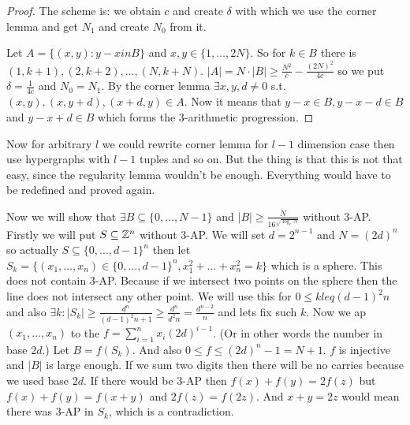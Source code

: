 \begin{proof}
	The scheme is: we obtain $c$ and create $\delta$ with which we use the corner lemma and get $N_1$ and create $N_0$ from it.
	
	Let $A = \{(x,y) : y-x in B\}$ and $x,y \in \{1, \dots, 2N\}$. So for $k \in B$ there is $(1,k+1), (2,k+2), \dots, (N, k+N)$. $|A| = N \cdot |B| \geq \frac{N^2}{c} - \frac{(2N)^2}{4c}$ so we put $\delta = \frac{1}{4c}$ and $N_0 = N_1$. By the corner lemma $\exists x,y,d \neq 0$ s.t. $(x,y), (x,y+d), (x+d,y) \in A$. Now it means that $y-x \in B, y-x -d \in B$ and $y-x+d \in B$ which forms the 3-arithmetic progression.
\end{proof}

Now for arbitrary $l$ we could rewrite corner lemma for $l-1$ dimension case then use hypergraphs with $l-1$ tuples and so on. But the thing is that this is not that easy, since the regularity lemma wouldn't be enough. Everything would have to be redefined and proved again. %

Now we will show that $\exists B \subseteq \{0, \dots, N-1\}$ and $|B| \geq \frac{N}{16^{\sqrt{\log_e N}}}$ without 3-AP. Firstly we will put $S \subseteq \mathbb{Z}^n$ without 3-AP. We will set $d = 2^{n-1}$ and $N = (2d)^n$ so actually $S \subseteq \{0, \dots, d-1\}^n$ then let $S_k = \{(x_1, \dots, x_n) \in \{0, \dots, d-1\}^n, x_1^2 + \dots + x_n^2 = k\}$ which is a sphere. This does not contain 3-AP. Because if we intersect two points on the sphere then the line does not intersect any other point. We will use this for $0 \leq k leq (d-1)^2n$ and also $\exists k: |S_k| \geq \frac{d^n}{(d-1)^2n+1} \geq \frac{d^n}{d^2n} = \frac{d^{n-2}}{n}$ and lets fix such $k$. Now we ap $(x_1, \dots, x_n)$ to the $f = \sum_{i = 1}^n x_i (2d)^{i-1}$. (Or in other words the number in base $2d$.) Let $B = f(S_k)$. And also $0 \leq f \leq (2d)^n - 1 = N +1$. $f$ is injective and $|B|$ is large enough. If we sum two digits then there will be no carries because we used base $2d$. If there would be 3-AP then $f(x) + f(y) = 2f(z)$ but $f(x) + f(y) = f(x + y)$ and $2f(z) = f(2z)$. And $x + y = 2z$ would mean there was 3-AP in $S_k$, which is a contradiction.